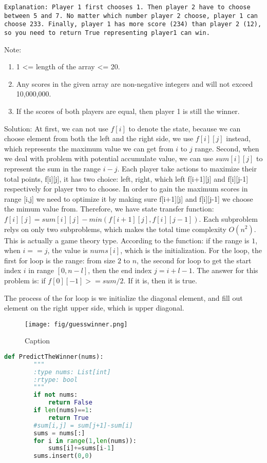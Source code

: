 \documentclass[../main.tex]{subfiles}
\begin{document}
\begin{examples}[resume]
\begin{lstlisting}[numbers=none]
Explanation: Player 1 first chooses 1. Then player 2 have to choose between 5 and 7. No matter which number player 2 choose, player 1 can choose 233. Finally, player 1 has more score (234) than player 2 (12), so you need to return True representing player1 can win.
\end{lstlisting}
Note:
\begin{enumerate}
    \item 1 <= length of the array <= 20.
    \item Any scores in the given array are non-negative integers and will not exceed 10,000,000.
    \item If the scores of both players are equal, then player 1 is still the winner.
    \end{enumerate}
Solution: At first, we can not use $f[i]$ to denote the state, because we can choose element from both the left and the right side, we  use $f[i][j]$ instead, which represents the maximum value we can get from $i$ to $j$ range. Second, when we deal with problem with potential accumulate value, we can use $sum[i][j]$ to represent the sum in the range $i-j$. Each player take actions to maximize their total points, f[i][j], it has two choice: left, right, which left f[i+1][j] and f[i][j-1] respectively for player two to choose. In order to gain the maximum scores in range [i,j] we need to optimize it by making sure f[i+1][j] and f[i][j-1] we choose the mimum value from. Therefore, we have state transfer function: $f[i][j] = sum[i][j] - min(f[i+1][j], f[i][j-1])$. Each subproblem relys on only two subproblems, which makes the total time complexity $O(n^2)$.  This is actually a game theory type. According to the function: if the range is $1$, when $i==j$, the value is $nums[i]$, which is the initialization. For the loop, the first for loop is the range: from size $2$ to $n$, the second for loop to get the start index $i$ in range $[0, n-l]$, then the end index $j = i+l-1$. The answer for this problem is: if $f[0][-1]>=sum/2$. If it is, then it is true.

The process of the for loop is we initialize the diagonal element, and fill out element on the right upper side, which is upper diagonal. 
\begin{figure}[h]
    \centering
    \texttt{[image: fig/guesswinner.png]}
    \caption{Caption}
    \label{fig:my_label}
\end{figure}
\begin{lstlisting}[language = Python]
def PredictTheWinner(nums):
        """
        :type nums: List[int]
        :rtype: bool
        """
        if not nums:
            return False
        if len(nums)==1:
            return True
        #sum[i,j] = sum[j+1]-sum[i]
        sums = nums[:]
        for i in range(1,len(nums)):
            sums[i]+=sums[i-1]
        sums.insert(0,0)
        

\end{lstlisting}
\end{examples}
\end{document}
